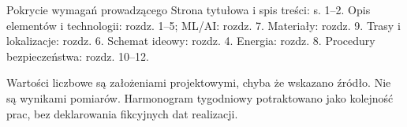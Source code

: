 \tableofcontents
\vfill
\begin{note}{Pokrycie wymagań prowadzącego}
Strona tytułowa i spis treści: s. 1--2. Opis elementów i technologii: rozdz. 1--5; ML/AI: rozdz. 7. Materiały: rozdz. 9. Trasy i lokalizacje: rozdz. 6. Schemat ideowy: rozdz. 4. Energia: rozdz. 8. Procedury bezpieczeństwa: rozdz. 10--12.
\end{note}
{\small\color{muted}Wartości liczbowe są założeniami projektowymi, chyba że wskazano źródło. Nie są wynikami pomiarów. Harmonogram tygodniowy potraktowano jako kolejność prac, bez deklarowania fikcyjnych dat realizacji.}
